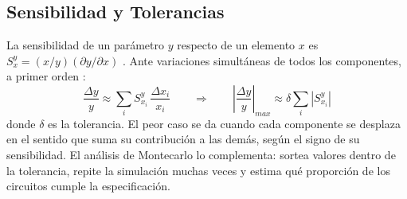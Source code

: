 \subsection{Sensibilidad y Tolerancias}
\label{sec_2.4}
La sensibilidad de un parámetro $y$ respecto de un elemento $x$ es $S_x^y = (x/y)(\partial y/\partial x)$ \cite[sec.~5.1]{daryanani}. Ante variaciones simultáneas de todos los componentes, a primer orden \cite[sec.~5.2, ec.~5.19]{daryanani}:
\begin{equation}
    \frac{\Delta y}{y} \approx \sum_i S_{x_i}^{y} \, \frac{\Delta x_i}{x_i}
    \qquad \Rightarrow \qquad
    \left|\frac{\Delta y}{y}\right|_{max} \approx \delta \sum_i \left|S_{x_i}^{y}\right|
    \label{eq:peor}
\end{equation}
donde $\delta$ es la tolerancia. El peor caso se da cuando cada componente se desplaza en el sentido que suma su contribución a las demás, según el signo de su sensibilidad. El análisis de Montecarlo lo complementa: sortea valores dentro de la tolerancia, repite la simulación muchas veces y estima qué proporción de los circuitos cumple la especificación.
